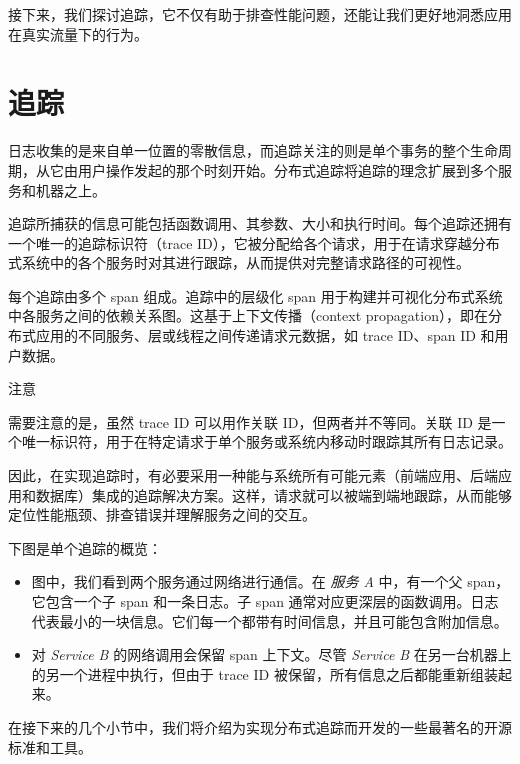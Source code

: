 \label{idx:1907}
接下来，我们探讨追踪，它不仅有助于排查性能问题，还能让我们更好地洞悉应用在真实流量下的行为。

\section{追踪}

\label{idx:1908}
日志收集的是来自单一位置的零散信息，而追踪关注的则是单个事务的整个生命周期，从它由用户操作发起的那个时刻开始。分布式追踪将追踪的理念扩展到多个服务和机器之上。

追踪所捕获的信息可能包括函数调用、其参数、大小和执行时间。每个追踪还拥有一个唯一的追踪标识符（trace ID），它被分配给各个请求，用于在请求穿越分布式系统中的各个服务时对其进行跟踪，从而提供对完整请求路径的可视性。

每个追踪由多个 span 组成。追踪中的层级化 span 用于构建并可视化分布式系统中各服务之间的依赖关系图。这基于上下文传播（context propagation），即在分布式应用的不同服务、层或线程之间传递请求元数据，如 trace ID、span ID 和用户数据。

\begin{myNotic}{注意}

需要注意的是，虽然 trace ID 可以用作关联 ID，但两者并不等同。关联 ID 是一个唯一标识符，用于在特定请求于单个服务或系统内移动时跟踪其所有日志记录。
\end{myNotic}

\label{idx:1909}
因此，在实现追踪时，有必要采用一种能与系统所有可能元素（前端应用、后端应用和数据库）集成的追踪解决方案。这样，请求就可以被端到端地跟踪，从而能够定位性能瓶颈、排查错误并理解服务之间的交互。

下图是单个追踪的概览：


\begin{itemize}
\item 图中，我们看到两个服务通过网络进行通信。在 \emph{服务 A} 中，有一个父 span，它包含一个子 span 和一条日志。子 span 通常对应更深层的函数调用。日志代表最小的一块信息。它们每一个都带有时间信息，并且可能包含附加信息。
\item 对 \emph{Service B} 的网络调用会保留 span 上下文。尽管 \emph{Service B} 在另一台机器上的另一个进程中执行，但由于 trace ID 被保留，所有信息之后都能重新组装起来。
\end{itemize}

在接下来的几个小节中，我们将介绍为实现分布式追踪而开发的一些最著名的开源标准和工具。

